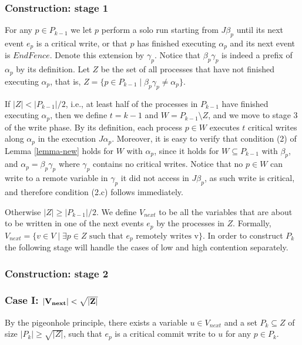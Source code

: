 \subsubsection{Construction: stage 1}
For any $p \in P_{k-1}$ we let $p$ perform a solo run starting from $J \beta_p$ until its next event $e_p$ is a critical write, or that $p$ has finished executing $\alpha_p$ and its next event is $EndFence$. Denote this extension by $\gamma_p$. Notice that $\beta_p \gamma_p$ is indeed a prefix of $\alpha_p$ by its definition.
Let $Z$ be the set of all processes that have not finished executing $\alpha_p$, that is, $Z = \{p \in P_{k-1} \mid \beta_p \gamma_p \neq \alpha_p\}$.

If $|Z|<|P_{k-1}|/2$, i.e., at least half of the processes in $P_{k-1}$ have finished executing $\alpha_p$, then we define $t=k-1$ and $W = P_{k-1} \setminus Z$, and we move to stage 3 of the write phase.
By its definition, each process $p \in W$ executes $t$ critical writes along $\alpha_p$ in the execution $J \alpha_p$. Moreover, it is easy to verify that condition (2) of Lemma \ref{lemma-new} holds for $W$ with $\alpha_p$, since it holds for $W \subseteq P_{k-1}$ with $\beta_p$, and $\alpha_p = \beta_p \gamma_p$ where $\gamma_p$ contains no critical writes. Notice that no $p \in W$ can write to a remote variable in $\gamma_p$ it did not access in $J \beta_p$, as such write is critical, and therefore condition (2.c) follows immediately.

Otherwise $|Z| \geq |P_{k-1}|/2$. We define $V_{next}$ to be all the variables that are about to be written in one of the next events $e_p$ by the processes in $Z$. Formally, $V_{next} = \{v \in V \mid \exists p \in Z \text{ such that } e_p \text{ remotely writes v}\}$. In order to construct $P_k$ the following stage will handle the cases of low and high contention separately.


\subsubsection{Construction: stage 2}


\subsubsection*{\hspace{5mm} Case I: $\bf |V_{next}| < \sqrt{|Z|}$}

By the pigeonhole principle, there exists a variable $u \in V_{next}$ and a set $P_k \subseteq Z$ of size $|P_k| \geq \sqrt{|Z|}$, such that $e_p$ is a critical commit write to $u$ for any $p \in P_k$.


